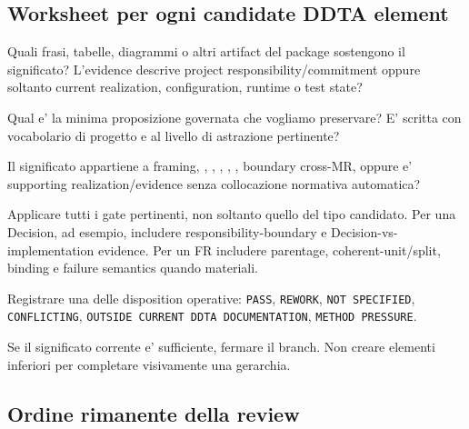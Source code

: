 \documentclass[11pt,a4paper]{article}
\begin{document}
\subsection{Worksheet per ogni candidate DDTA element}

\begin{ddtacheck}[title={1. Source evidence}]
Quali frasi, tabelle, diagrammi o altri artifact del package sostengono il significato? L'evidence descrive project responsibility/commitment oppure soltanto current realization, configuration, runtime o test state?
\end{ddtacheck}

\begin{ddtacheck}[title={2. Candidate project meaning}]
Qual e' la minima proposizione governata che vogliamo preservare? E' scritta con vocabolario di progetto e al livello di astrazione pertinente?
\end{ddtacheck}

\begin{ddtacheck}[title={3. Semantic owner}]
Il significato appartiene a framing, \MR, \DEC, \FR, \SR, \SECR, boundary cross-MR, oppure e' supporting realization/evidence senza collocazione normativa automatica?
\end{ddtacheck}

\begin{ddtacheck}[title={4. Relevant gates}]
Applicare tutti i gate pertinenti, non soltanto quello del tipo candidato. Per una Decision, ad esempio, includere responsibility-boundary e Decision-vs-implementation evidence. Per un FR includere parentage, coherent-unit/split, binding e failure semantics quando materiali.
\end{ddtacheck}

\begin{ddtacheck}[title={5. Explicit disposition}]
Registrare una delle disposition operative: \texttt{PASS}, \texttt{REWORK}, \texttt{NOT SPECIFIED}, \texttt{CONFLICTING}, \texttt{OUTSIDE CURRENT DDTA DOCUMENTATION}, \texttt{METHOD PRESSURE}.
\end{ddtacheck}

\begin{ddtacheck}[title={6. Stopping decision}]
Se il significato corrente e' sufficiente, fermare il branch. Non creare elementi inferiori per completare visivamente una gerarchia.
\end{ddtacheck}

\subsection{Ordine rimanente della review}
\end{document}
